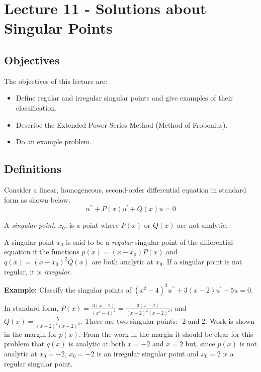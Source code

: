 \chapter{Lecture 11 - Solutions about Singular Points}
\label{ch:lec11}
\section{Objectives}
The objectives of this lecture are:
\begin{itemize}
\item Define regular and irregular singular points and give examples of their classification.
\item Describe the Extended Power Series Method (Method of Frobenius).
\item Do an example problem.
\end{itemize}

\section{Definitions}
Consider a linear, homogeneous, second-order differential equation in standard form as shown below:
\begin{equation*}
u^{\prime \prime} + P(x)u^{\prime} + Q(x)u = 0
\end{equation*}

\begin{definition}
A \emph{singular point}, $x_0$, is a point where $P(x)$ or $Q(x)$ are not analytic.
\end{definition}

\begin{definition}
A singular point $x_0$ is said to be a \emph{regular} singular point of the differential equation if the functions $p(x)=(x-x_0)P(x)$ and $q(x)=(x-x_0)^2Q(x)$ are both analytic at $x_0$.  If a singular point is not regular, it is \emph{irregular}.
\end{definition}

\noindent\textbf{Example:} Classify the singular points of $(x^2-4)^2u^{\prime\prime}+3(x-2)u^{\prime}+5u = 0$.

\vspace{0.5cm}

\noindent In standard form, $P(x) = \frac{3(x-2)}{(x^2-4)^2} = \frac{3(x-2)}{(x+2)^2(x-2)^2}$; and $Q(x) = \frac{5}{(x+2)^2(x-2)^2}$.  There are two singular points: -2 and 2.
Work is shown in the margin for $p(x)$.  From the work in the margin it should be clear for this problem that $q(x)$ is analytic at both $x=-2$ and $x=2$ but, since $p(x)$ is not analytic at $x_0=-2$, $x_0=-2$ is an irregular singular point and $x_0=2$ is a regular singular point.


